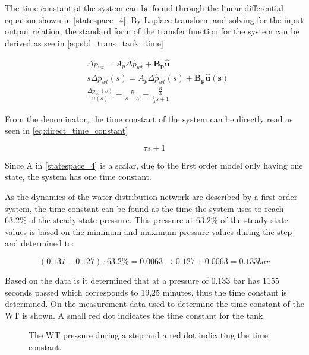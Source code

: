 The time constant of the system can be found through the linear differential equation shown in \eqref{statespace_4}. By Laplace transform and solving for the input output relation, the standard form of the transfer function for the system can be derived as see in \eqref{eq:std_trans_tank_time}

\begin{equation}
	\begin{split}
	&\Delta \dot{p}_{wt} = A_p \Delta \hat{p}_{wt}  + \pmb{B_p}\pmb{\hat{u}}\\
	&s\Delta p_{wt}(s) = A_p \Delta \hat{p}_{wt}(s)  + \pmb{B_p}\pmb{\hat{u}(s)}\\
	&\frac{\Delta p_{wt}(s)}{u(s)} = \frac{B}{s-A} = \frac{\frac{B}{A}}{\frac{1}{A}s + 1}
	\end{split}
	\label{eq:std_trans_tank_time}
\end{equation}

From the denominator, the time constant of the system can be directly read as seen in \eqref{eq:direct_time_constant}

\begin{equation}
	\tau s + 1
	\label{eq:direct_time_constant}
\end{equation}

 Since A in \eqref{statespace_4} is a scalar, due to the first order model only having one state, the system has one time constant. 

As the dynamics of the water distribution network are described by a first order system, the time constant can be found as the time the system uses to reach $63.2\%$ of the steady state pressure.
This pressure at $63.2\%$ of the steady state values is based on the minimum and maximum pressure values during the step and determined to:

\begin{equation}
(0.137 - 0.127)\cdot63.2 \% = 0.0063 \rightarrow 0.127 + 0.0063 = 0.133 \unit{bar} 
\end{equation}

Based on the data is it determined that at a pressure of 0.133 bar has 1155 seconds passed which corresponds to 19,25 minutes, thus the time constant is determined. 
On  the measurement data used to determine the time constant of the WT is shown. A small red dot indicates the time constant for the tank.

\begin{figure}[H]

\caption{The WT pressure during a step and a red dot indicating the time constant.}
\label{fig:Test_WT_Timeconstant}
\end{figure}

